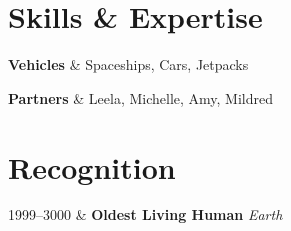 \documentclass{article}
\begin{document}
  \bigskip

  \section*{Skills \& Expertise}
    \begin{CvTable}
    	\textbf{Vehicles} & Spaceships, Cars, Jetpacks\\
    \end{CvTable} %
    \begin{CvTable}
    	\textbf{Partners} & Leela, Michelle, Amy, Mildred \\
    \end{CvTable} %

  \bigskip

  \section*{Recognition}
    \begin{CvTable}
  	  1999--3000 & \textbf{Oldest Living Human} \hfill \textit{Earth}\\
    \end{CvTable} %
\end{document}
